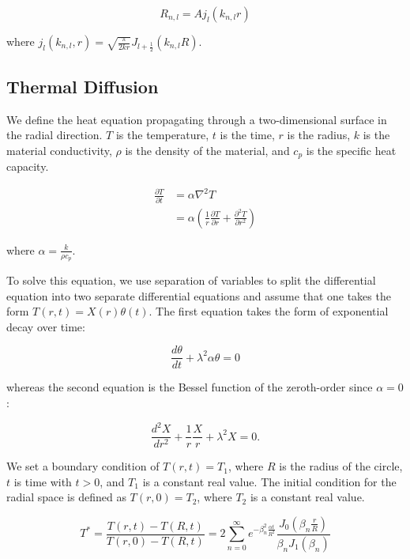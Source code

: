 \documentclass[linenumbers, RNAAS, trackchanges]{aastex631}
\begin{document}
\begin{equation}
    R_{n,l}=Aj_l(k_{n,l}r)
\end{equation}

\noindent where $j_l(k_{n,l},r)=\sqrt{\frac{\pi}{2kr}}J_{l+\frac{1}{2}}(k_{n,l}R)$.


\subsection{Thermal Diffusion}

We define the heat equation propagating through a two-dimensional surface in
the radial direction. $T$ is the temperature, $t$ is the time, $r$ is the radius,
$k$ is the material conductivity, $\rho$ is the density of the material, and $c_p$
is the specific heat capacity.

\begin{align}
    \frac{\partial T}{\partial t}&=\alpha\nabla^2T\\
    &=\alpha\left(\frac{1}{r} \frac{\partial T}{\partial r} + \frac{\partial^2 T}{\partial r^2}\right)
\end{align}

\noindent where $\alpha=\frac{k}{\rho c_p}$.

To solve this equation, we use separation of variables to split the 
differential equation into two separate differential equations and assume
that one takes the form $T(r,t)=X(r)\theta(t)$. The first equation takes the
form of exponential decay over time:

\begin{equation}
    \frac{d\theta}{dt}+\lambda^2\alpha\theta=0
\end{equation}

\noindent whereas the second equation is the Bessel function of the zeroth-order
since $\alpha=0$:

\begin{equation}
    \frac{d^2X}{dr^2}+\frac{1}{r}\frac{X}{r}+\lambda^2X=0.
\end{equation}

We set a boundary condition of $T(r,t)=T_1$, where $R$ is the radius of the circle,
$t$ is time with $t>0$, and $T_1$ is a constant real value. The initial condition for
the radial space is defined as $T(r,0)=T_2$, where $T_2$ is a constant real value.

\begin{equation}
    T^*=\frac{T(r,t)-T(R,t)}{T(r,0)-T(R,t)}=2\sum_{n=0}^\infty e^{-\beta_{n}^2 \frac{\alpha t}{R^2}} \frac{J_0(\beta_n\frac{r}{R})}{\beta_nJ_1(\beta_n)}
    \label{eq:T_star}
\end{equation}
\end{document}

